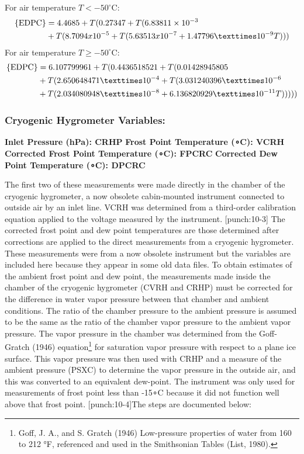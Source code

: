 \documentclass[
  english,
]{book}
\begin{document}
For air temperature \(T < -50^\circ\)C:\\
\begin{align}
\mathrm{\{EDPC\}} &= 4.4685 + T(0.27347 + T (6.83811\times 10^{-3}\notag \\
&+ T(8.7094x10^{-5} + T(5.63513x10^{-7} + 1.47796 × 10^{-9}T)))
\label{eq:EDPC1}
\end{align}
For air temperature \(T \ge -50^\circ\)C:\\
\begin{align}
\mathrm{\{EDPC\}} &= 6.107799961 + T(0.4436518521 + T(0.01428945805\notag \\
&+ T(2.650648471 × 10^{-4} + T(3.031240396 × 10^{-6}\notag \\
&+ T (2.034080948 × 10^{-8} + 6.136820929 × 10^{-11}T)))))
\label{eq:EDPC2}
\end{align}

\hypertarget{cryo-hygro}{%
\subsubsection*{Cryogenic Hygrometer Variables:}\label{cryo-hygro}}

\textbf{Inlet Pressure (hPa): CRHP}
\textbf{Frost Point Temperature ({∘C}): VCRH}
\textbf{Corrected Frost Point Temperature ({∘C}): FPCRC}
\textbf{Corrected Dew Point Temperature ({∘C}): DPCRC}

The first two of these measurements were made directly in the chamber of the cryogenic hygrometer, a now obsolete cabin-mounted instrument connected to outside air by an inlet line. VCRH was determined from a third-order calibration equation applied to the voltage measured by the instrument. \protect\hypertarget{punch:10-3}{}{{[}punch:10-3{]}}
The corrected frost point and dew point temperatures are those determined after corrections are applied to the direct measurements from a cryogenic hygrometer. These measurements were from a now obsolete instrument but the variables are included here because they appear in some old data files. To obtain estimates of the ambient frost point and dew point, the measurements made inside the chamber of the cryogenic hygrometer (CVRH and CRHP) must be corrected for the difference in water vapor pressure between that chamber and ambient conditions. The ratio of the chamber pressure to the ambient pressure is assumed to be the same as the ratio of the chamber vapor pressure to the ambient vapor pressure. The vapor pressure in the chamber was determined from the Goff-Gratch (1946) equation\footnote{Goff, J. A., and S. Gratch (1946) Low-pressure properties of water from 160 to 212 °F, referenced and used in the Smithsonian Tables (List, 1980).}
for saturation vapor pressure with respect to a plane ice surface. This vapor pressure was then used with CRHP and a measure of the ambient pressure (PSXC) to determine the vapor pressure in the outside air, and this was converted to an equivalent dew-point. The instrument was only used for measurements of frost point less than -15{∘}C because it did not function well above that frost point. \protect\hypertarget{punch:10-4}{}{{[}punch:10-4{]}}The steps are documented below:
\end{document}
